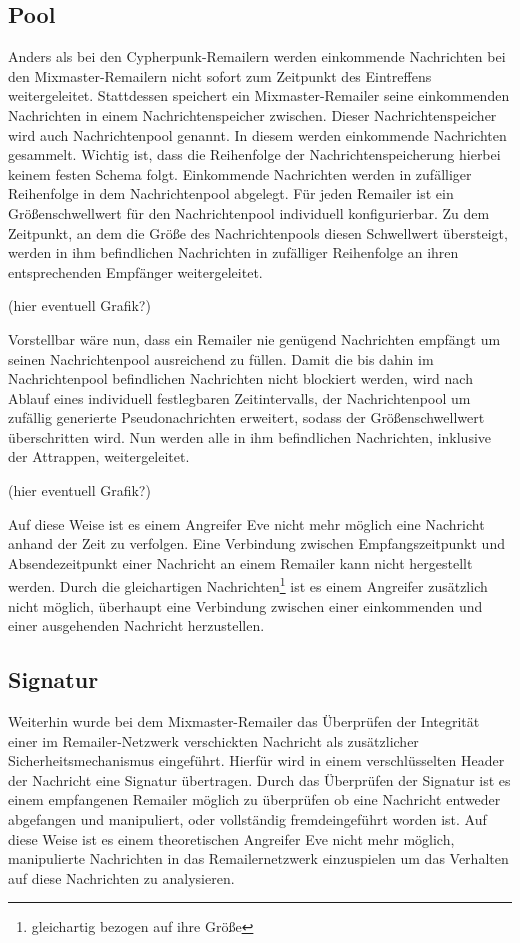 \subsection{Pool}
Anders als bei den Cypherpunk-Remailern werden einkommende Nachrichten bei den Mixmaster-Remailern nicht sofort zum Zeitpunkt des Eintreffens weitergeleitet. Stattdessen speichert ein Mixmaster-Remailer seine einkommenden Nachrichten in einem Nachrichtenspeicher zwischen. Dieser Nachrichtenspeicher wird auch Nachrichtenpool genannt. In diesem werden einkommende Nachrichten gesammelt. Wichtig ist, dass die Reihenfolge der Nachrichtenspeicherung hierbei keinem festen Schema folgt. Einkommende Nachrichten werden in zufälliger Reihenfolge in dem Nachrichtenpool abgelegt. Für jeden Remailer ist ein Größenschwellwert für den Nachrichtenpool individuell konfigurierbar. Zu dem Zeitpunkt, an dem die Größe des Nachrichtenpools diesen Schwellwert übersteigt, werden in ihm befindlichen Nachrichten in zufälliger Reihenfolge an ihren entsprechenden Empfänger weitergeleitet. 

(hier eventuell Grafik?)

Vorstellbar wäre nun, dass ein Remailer nie genügend Nachrichten empfängt um seinen Nachrichtenpool ausreichend zu füllen. Damit die bis dahin im Nachrichtenpool befindlichen Nachrichten nicht blockiert werden, wird nach Ablauf eines individuell festlegbaren Zeitintervalls, der Nachrichtenpool um zufällig generierte Pseudonachrichten erweitert, sodass der Größenschwellwert überschritten wird. Nun werden alle in ihm befindlichen Nachrichten, inklusive der Attrappen, weitergeleitet. 

(hier eventuell Grafik?)

Auf diese Weise ist es einem Angreifer Eve nicht mehr möglich eine Nachricht anhand der Zeit zu verfolgen. Eine Verbindung zwischen Empfangszeitpunkt und Absendezeitpunkt einer Nachricht an einem Remailer kann nicht hergestellt werden. Durch die gleichartigen Nachrichten\footnote{gleichartig bezogen auf ihre Größe} ist es einem Angreifer zusätzlich nicht möglich, überhaupt eine Verbindung zwischen einer einkommenden und einer ausgehenden Nachricht herzustellen. 


\subsection{Signatur}
Weiterhin wurde bei dem Mixmaster-Remailer das Überprüfen der Integrität einer im Remailer-Netzwerk verschickten Nachricht als zusätzlicher Sicherheitsmechanismus eingeführt. Hierfür wird in einem verschlüsselten Header der Nachricht eine Signatur übertragen. Durch das Überprüfen der Signatur ist es einem empfangenen Remailer möglich zu überprüfen ob eine Nachricht entweder abgefangen und manipuliert, oder vollständig fremdeingeführt worden ist. Auf diese Weise ist es einem theoretischen Angreifer Eve nicht mehr möglich, manipulierte Nachrichten in das Remailernetzwerk einzuspielen um das Verhalten auf diese Nachrichten zu analysieren.

